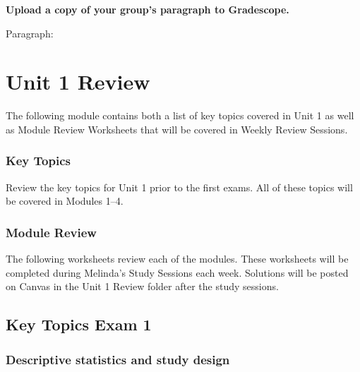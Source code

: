 \documentclass[
]{report}
\begin{document}
\textbf{Upload a copy of your group's paragraph to Gradescope.}

Paragraph:

\newpage

\chapter{Unit 1 Review}\label{unit-1-review}

The following module contains both a list of key topics covered in Unit 1 as well as Module Review Worksheets that will be covered in Weekly Review Sessions.

\subsection{Key Topics}\label{key-topics-4}

Review the key topics for Unit 1 prior to the first exams. All of these topics will be covered in Modules 1--4.

\subsection{Module Review}\label{module-review}


The following worksheets review each of the modules. These worksheets will be completed during Melinda's Study Sessions each week. Solutions will be posted on Canvas in the Unit 1 Review folder after the study sessions.

\newpage

\section{Key Topics Exam 1}\label{key-topics-exam-1}

\subsection*{Descriptive statistics and study design}\label{descriptive-statistics-and-study-design}
\end{document}
